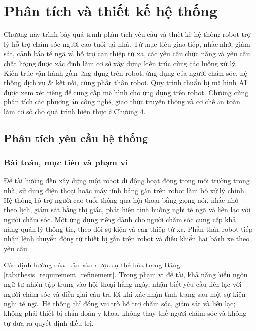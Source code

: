 \section{Phân tích và thiết kế hệ thống}

Chương này trình bày quá trình phân tích yêu cầu và thiết kế hệ thống robot trợ lý hỗ trợ chăm sóc người cao tuổi tại nhà. Từ mục tiêu giao tiếp, nhắc nhở, giám sát, cảnh báo té ngã và hỗ trợ can thiệp từ xa, các yêu cầu chức năng và yêu cầu chất lượng được xác định làm cơ sở xây dựng kiến trúc cùng các luồng xử lý. Kiến trúc vận hành gồm ứng dụng trên robot, ứng dụng của người chăm sóc, hệ thống dịch vụ \& kết nối, cùng phần thân robot. Quy trình chuẩn bị mô hình AI được xem xét riêng để cung cấp mô hình cho ứng dụng trên robot. Chương cũng phân tích các phương án công nghệ, giao thức truyền thông và cơ chế an toàn làm cơ sở cho quá trình hiện thực ở Chương 4.

\subsection{Phân tích yêu cầu hệ thống}

\subsubsection{Bài toán, mục tiêu và phạm vi}

Đề tài hướng đến xây dựng một robot di động hoạt động trong môi trường trong nhà, sử dụng điện thoại hoặc máy tính bảng gắn trên robot làm bộ xử lý chính. Hệ thống hỗ trợ người cao tuổi thông qua hội thoại bằng giọng nói, nhắc nhở theo lịch, giám sát bằng thị giác, phát hiện tình huống nghi té ngã và liên lạc với người chăm sóc. Một ứng dụng riêng dành cho người chăm sóc cung cấp khả năng quản lý thông tin, theo dõi sự kiện và can thiệp từ xa. Phần thân robot tiếp nhận lệnh chuyển động từ thiết bị gắn trên robot và điều khiển hai bánh xe theo yêu cầu.

Các định hướng của luận văn được cụ thể hóa trong Bảng \ref{tab:thesis_requirement_refinement}. Trong phạm vi đề tài, khả năng hiểu ngôn ngữ tự nhiên tập trung vào hội thoại hằng ngày, nhận biết yêu cầu liên lạc với người chăm sóc và diễn giải câu trả lời khi xác nhận tình trạng sau một sự kiện nghi té ngã. Hệ thống chỉ đóng vai trò hỗ trợ chăm sóc, giám sát và liên lạc; không phải thiết bị chẩn đoán y khoa, không thay thế người chăm sóc và không tự đưa ra quyết định điều trị.

